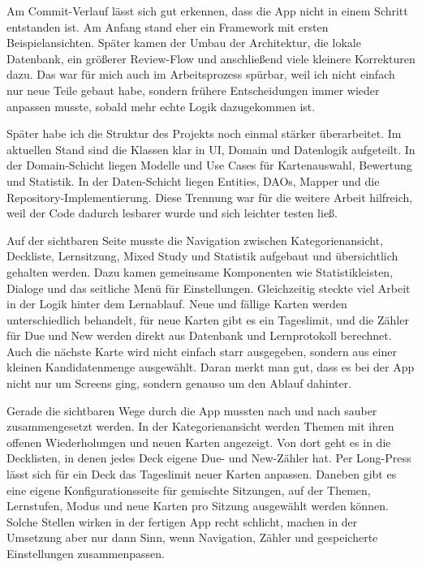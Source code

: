 \documentclass{Vorlage}
\begin{document}
Am Commit-Verlauf l\"asst sich gut erkennen, dass die App nicht in einem Schritt entstanden ist. Am Anfang stand eher ein Framework mit ersten Beispielansichten. Sp\"ater kamen der Umbau der Architektur, die lokale Datenbank, ein gr\"o\ss{}erer Review-Flow und anschlie\ss{}end viele kleinere Korrekturen dazu. Das war f\"ur mich auch im Arbeitsprozess sp\"urbar, weil ich nicht einfach nur neue Teile gebaut habe, sondern fr\"uhere Entscheidungen immer wieder anpassen musste, sobald mehr echte Logik dazugekommen ist.

Sp\"ater habe ich die Struktur des Projekts noch einmal st\"arker \"uberarbeitet. Im aktuellen Stand sind die Klassen klar in UI, Domain und Datenlogik aufgeteilt. In der Domain-Schicht liegen Modelle und Use Cases f\"ur Kartenauswahl, Bewertung und Statistik. In der Daten-Schicht liegen Entities, DAOs, Mapper und die Repository-Implementierung. Diese Trennung war f\"ur die weitere Arbeit hilfreich, weil der Code dadurch lesbarer wurde und sich leichter testen lie\ss{}.

Auf der sichtbaren Seite musste die Navigation zwischen Kategorienansicht, Deckliste, Lernsitzung, Mixed Study und Statistik aufgebaut und \"ubersichtlich gehalten werden. Dazu kamen gemeinsame Komponenten wie Statistikleisten, Dialoge und das seitliche Men\"u f\"ur Einstellungen. Gleichzeitig steckte viel Arbeit in der Logik hinter dem Lernablauf. Neue und f\"allige Karten werden unterschiedlich behandelt, f\"ur neue Karten gibt es ein Tageslimit, und die Z\"ahler f\"ur Due und New werden direkt aus Datenbank und Lernprotokoll berechnet. Auch die n\"achste Karte wird nicht einfach starr ausgegeben, sondern aus einer kleinen Kandidatenmenge ausgew\"ahlt. Daran merkt man gut, dass es bei der App nicht nur um Screens ging, sondern genauso um den Ablauf dahinter.

Gerade die sichtbaren Wege durch die App mussten nach und nach sauber zusammengesetzt werden. In der Kategorienansicht werden Themen mit ihren offenen Wiederholungen und neuen Karten angezeigt. Von dort geht es in die Decklisten, in denen jedes Deck eigene Due- und New-Z\"ahler hat. Per Long-Press l\"asst sich f\"ur ein Deck das Tageslimit neuer Karten anpassen. Daneben gibt es eine eigene Konfigurationsseite f\"ur gemischte Sitzungen, auf der Themen, Lernstufen, Modus und neue Karten pro Sitzung ausgew\"ahlt werden k\"onnen. Solche Stellen wirken in der fertigen App recht schlicht, machen in der Umsetzung aber nur dann Sinn, wenn Navigation, Z\"ahler und gespeicherte Einstellungen zusammenpassen.
\end{document}
